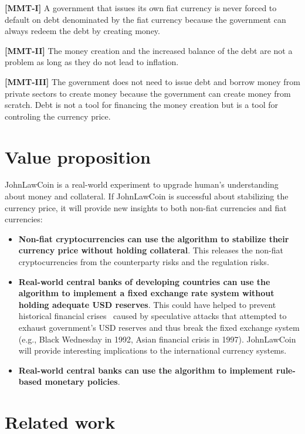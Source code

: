 \documentclass[dvipdfmx,a4paper]{article}
\begin{document}
\begin{description}
\item{\textbf{[MMT-I]}} A government that issues its own fiat currency is never forced to default on debt denominated by the fiat currency because the government can always redeem the debt by creating money.
\item{\textbf{[MMT-II]}} The money creation and the increased balance of the debt are not a problem as long as they do not lead to inflation.
\item{\textbf{[MMT-III]}} The government does not need to issue debt and borrow money from private sectors to create money because the government can create money from scratch. Debt is not a tool for financing the money creation but is a tool for controling the currency price.
\end{description}

\section{Value proposition}

JohnLawCoin is a real-world experiment to upgrade human's understanding about money and collateral. If JohnLawCoin is successful about stabilizing the currency price, it will provide new insights to both non-fiat currencies and fiat currencies:

\begin{itemize}
\item \textbf{Non-fiat cryptocurrencies can use the algorithm to stabilize their currency price without holding collateral}. This releases the non-fiat cryptocurrencies from the counterparty risks and the regulation risks.
\item \textbf{Real-world central banks of developing countries can use the algorithm to implement a fixed exchange rate system without holding adequate USD reserves}. This could have helped to prevent historical financial crises~\cite{ferguson2008ascent} caused by speculative attacks that attempted to exhaust government's USD reserves and thus break the fixed exchange system (e.g., Black Wednesday in 1992, Asian financial crisis in 1997). JohnLawCoin will provide interesting implications to the international currency systems.
\item \textbf{Real-world central banks can use the algorithm to implement rule-based monetary policies}.
\end{itemize}

\section{Related work}
\end{document}
